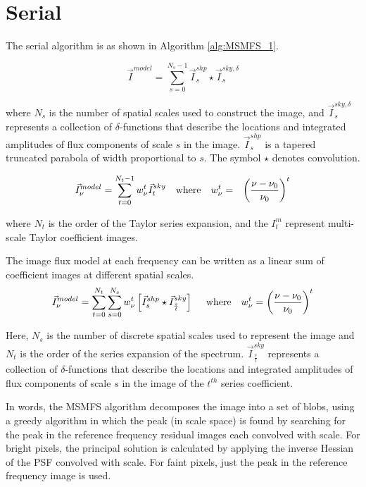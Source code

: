 \documentclass[11pt,a4paper]{article}
\begin{document}
\clearpage
\section{Serial}
\label{sec:serial}

The serial algorithm is as shown in Algorithm \ref{alg:MSMFS_1}.

\begin{equation}
\vec{I}^{model} = \sum_{s=0}^{N_s-1}  \vec{I}^{shp}_{s} \star \vec{I}^{sky,\delta}_s
\label{Eq:ms_model}
\end{equation}

where $N_s$ is the number of spatial scales used to construct the image, and
$\vec{I}^{sky,\delta}_{s}$ represents a collection of $\delta$-functions that describe the locations
and integrated amplitudes of flux components of scale $s$ in the image. $\vec{I}^{shp}_s$ is a tapered truncated parabola of width proportional to $s$.
The symbol $\star$ denotes convolution. 

\begin{eqnarray}
\label{eqn:mf_model}
\vec{I}^{model}_{\nu} = \sum_{t=0}^{N_t-1} {w_{\nu}^t} \vec{I}^{sky}_{t} ~~~\mathrm{where}~~~ {w_{\nu}^t}&=&{\left(\frac{\nu-\nu_0}{\nu_0}\right)}^t 
\end{eqnarray}

where $N_t$ is the order of the Taylor series expansion, and 
the $I^m_t$ represent multi-scale Taylor coefficient images.

The image flux model at each frequency can be written as a linear sum of  
coefficient images at different spatial scales. 
\begin{equation}
\vec{I}^{model}_{\nu} = \sum_{t=0}^{N_t} \sum_{s=0}^{N_s} {w_{\nu}^t} \left[ \vec{I}^{shp}_s \star \vec{I}^{sky}_\frac{s}{t}\right] ~~~~\mathrm{where}~~~{w_{\nu}^t} = {\left(\frac{\nu-\nu_0}{\nu_0}\right)}^t 
\label{eqn:msmf_model}
\end{equation}

Here, $N_s$ is the number of discrete spatial scales used to represent the image and  
$N_t$ is the order of the series expansion of the spectrum. $\vec{I}^{sky}_\frac{s}{t}$ represents 
a collection of $\delta$-functions that describe the locations
and integrated amplitudes of flux components of scale $s$ in the image of the $t^{th}$ series 
coefficient. 

In words, the MSMFS algorithm decomposes the image into a set of blobs, using a greedy algorithm in which the peak (in scale space) is found by searching for the peak in the reference frequency residual images each convolved with scale. For bright pixels, the principal solution is calculated by applying the inverse Hessian of the PSF convolved with scale. For faint pixels, just the peak in the reference frequency image is used. 
\end{document}
